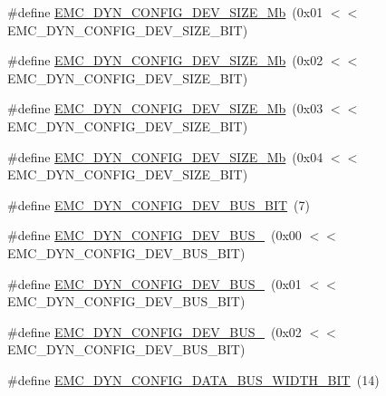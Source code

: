 \begin{DoxyCompactItemize}
\#define \hyperlink{group___e_m_c__18_x_x__43_x_x_gab41dd56ed3f05fa1222eebaa560f604f}{E\+M\+C\+\_\+\+D\+Y\+N\+\_\+\+C\+O\+N\+F\+I\+G\+\_\+\+D\+E\+V\+\_\+\+S\+I\+Z\+E\+\_\+Mb}~(0x01 $<$$<$ E\+M\+C\+\_\+\+D\+Y\+N\+\_\+\+C\+O\+N\+F\+I\+G\+\_\+\+D\+E\+V\+\_\+\+S\+I\+Z\+E\+\_\+\+B\+I\+T)
\item 
\#define \hyperlink{group___e_m_c__18_x_x__43_x_x_gaf6a4f9a7622f01f91bb988d643ad241e}{E\+M\+C\+\_\+\+D\+Y\+N\+\_\+\+C\+O\+N\+F\+I\+G\+\_\+\+D\+E\+V\+\_\+\+S\+I\+Z\+E\+\_\+Mb}~(0x02 $<$$<$ E\+M\+C\+\_\+\+D\+Y\+N\+\_\+\+C\+O\+N\+F\+I\+G\+\_\+\+D\+E\+V\+\_\+\+S\+I\+Z\+E\+\_\+\+B\+I\+T)
\item 
\#define \hyperlink{group___e_m_c__18_x_x__43_x_x_ga657b8cd5326c87064cee25fe2d0f4a62}{E\+M\+C\+\_\+\+D\+Y\+N\+\_\+\+C\+O\+N\+F\+I\+G\+\_\+\+D\+E\+V\+\_\+\+S\+I\+Z\+E\+\_\+Mb}~(0x03 $<$$<$ E\+M\+C\+\_\+\+D\+Y\+N\+\_\+\+C\+O\+N\+F\+I\+G\+\_\+\+D\+E\+V\+\_\+\+S\+I\+Z\+E\+\_\+\+B\+I\+T)
\item 
\#define \hyperlink{group___e_m_c__18_x_x__43_x_x_ga4e9dd56fb0ab4e1fcec9b048cfbb3f46}{E\+M\+C\+\_\+\+D\+Y\+N\+\_\+\+C\+O\+N\+F\+I\+G\+\_\+\+D\+E\+V\+\_\+\+S\+I\+Z\+E\+\_\+Mb}~(0x04 $<$$<$ E\+M\+C\+\_\+\+D\+Y\+N\+\_\+\+C\+O\+N\+F\+I\+G\+\_\+\+D\+E\+V\+\_\+\+S\+I\+Z\+E\+\_\+\+B\+I\+T)
\item 
\#define \hyperlink{group___e_m_c__18_x_x__43_x_x_ga9fdf18f00bc1d47bd4c082e95d8f88a4}{E\+M\+C\+\_\+\+D\+Y\+N\+\_\+\+C\+O\+N\+F\+I\+G\+\_\+\+D\+E\+V\+\_\+\+B\+U\+S\+\_\+\+B\+IT}~(7)
\item 
\#define \hyperlink{group___e_m_c__18_x_x__43_x_x_ga678b237231d74cd04ca440a76f806bac}{E\+M\+C\+\_\+\+D\+Y\+N\+\_\+\+C\+O\+N\+F\+I\+G\+\_\+\+D\+E\+V\+\_\+\+B\+U\+S\+\_}~(0x00 $<$$<$ E\+M\+C\+\_\+\+D\+Y\+N\+\_\+\+C\+O\+N\+F\+I\+G\+\_\+\+D\+E\+V\+\_\+\+B\+U\+S\+\_\+\+B\+I\+T)
\item 
\#define \hyperlink{group___e_m_c__18_x_x__43_x_x_ga49c225473843eb5e94e96a10277decec}{E\+M\+C\+\_\+\+D\+Y\+N\+\_\+\+C\+O\+N\+F\+I\+G\+\_\+\+D\+E\+V\+\_\+\+B\+U\+S\+\_}~(0x01 $<$$<$ E\+M\+C\+\_\+\+D\+Y\+N\+\_\+\+C\+O\+N\+F\+I\+G\+\_\+\+D\+E\+V\+\_\+\+B\+U\+S\+\_\+\+B\+I\+T)
\item 
\#define \hyperlink{group___e_m_c__18_x_x__43_x_x_ga3f8e37fa7ac9e5baa4a3a1d955a942cc}{E\+M\+C\+\_\+\+D\+Y\+N\+\_\+\+C\+O\+N\+F\+I\+G\+\_\+\+D\+E\+V\+\_\+\+B\+U\+S\+\_}~(0x02 $<$$<$ E\+M\+C\+\_\+\+D\+Y\+N\+\_\+\+C\+O\+N\+F\+I\+G\+\_\+\+D\+E\+V\+\_\+\+B\+U\+S\+\_\+\+B\+I\+T)
\item 
\#define \hyperlink{group___e_m_c__18_x_x__43_x_x_ga602bb21c09f90f30e1601e3dd704c03e}{E\+M\+C\+\_\+\+D\+Y\+N\+\_\+\+C\+O\+N\+F\+I\+G\+\_\+\+D\+A\+T\+A\+\_\+\+B\+U\+S\+\_\+\+W\+I\+D\+T\+H\+\_\+\+B\+IT}~(14)
$$
\end{DoxyCompactItemize}
